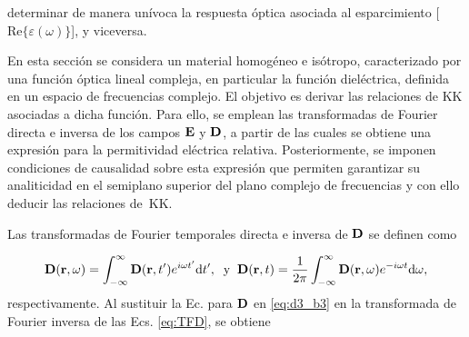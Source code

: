 determinar de manera unívoca la respuesta óptica asociada al esparcimiento [$\text{Re}\{\varepsilon(\omega)\}$], y viceversa.

En esta sección se considera un material homogéneo e isótropo, caracterizado por una función óptica lineal compleja, en particular la función dieléctrica, definida en un espacio de frecuencias complejo. El objetivo es derivar las relaciones de KK asociadas a dicha función. Para ello, se emplean las transformadas de Fourier directa e inversa de los campos $\vb{E}$ y $\vb{D}$, a partir de las cuales se obtiene una expresión para la permitividad eléctrica relativa. Posteriormente, se imponen condiciones de causalidad sobre esta expresión que permiten  garantizar su analiticidad en el semiplano superior del plano complejo de frecuencias y con ello deducir las relaciones de~KK.

Las transformadas de Fourier temporales directa e inversa de $\vb{D}$ se definen como~\cite{jacksonClassicalElectrodynamics2021}

%
\begin{equation}
	\vb{D}(\vb{r},\omega)=\int_{-\infty}^{\infty}\vb{D}(\vb{r},t')e^{i\omega t'}\text{d}t',\;\;\text{y}\;\;\vb{D}(\vb{r},t)=\frac{1}{2\pi}\int_{-\infty}^{\infty}\vb{D}(\vb{r},\omega)e^{-i\omega t}\text{d}\omega,\label{eq:TFD}
\end{equation}
%
respectivamente. Al sustituir la Ec. para $\vb{D}$ en  \eqref{eq:d3_b3} en la transformada de Fourier inversa de las Ecs. \eqref{eq:TFD}, se obtiene
\vspace{-0.5cm}

